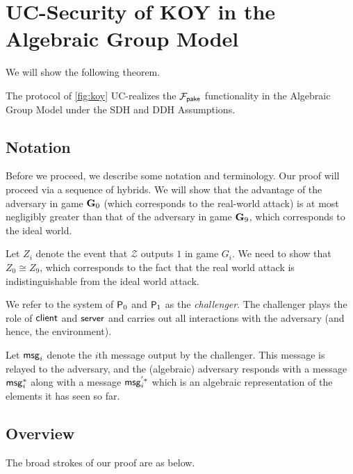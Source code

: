 \section{UC-Security of KOY in the Algebraic Group Model}

We will show the following theorem.

\begin{theorem}
	The protocol of \cref{fig:koy} UC-realizes the $\mathcal{F}_{\mathsf{pake}}$ functionality in the Algebraic Group Model under the SDH and DDH Assumptions.
\end{theorem}

\subsection{Notation}

Before we proceed, we describe some notation and terminology. Our proof will proceed via a sequence of hybrids. We will show that the advantage of the adversary in game $\mathbf{G}_0$ (which corresponds to the real-world attack) is at most negligibly greater than that of the adversary in game $\mathbf{G}_9$, which corresponds to the ideal world.

Let $Z_i$ denote the event that $\mathcal{Z}$ outputs $1$ in game $G_i$. We need to show that $Z_0\cong Z_9$, which corresponds to the fact that the real world attack is indistinguishable from the ideal world attack.

We refer to the system of $\mathsf{P}_0$ and $\mathsf{P}_1$ as the \textit{challenger}. The challenger plays the role of $\mathsf{client}$ and $\mathsf{server}$ and carries out all interactions with the adversary (and hence, the environment).

Let $\mathsf{msg}_{i}$ denote the $i$th message output by the challenger. This message is relayed to the adversary, and the (algebraic) adversary responds with a message $\mathsf{msg}_{i}^{*}$ along with a message $\mathsf{msg}_{i}^{'*}$ which is an algebraic representation of the elements it has seen so far. 


\subsection{Overview}

The broad strokes of our proof are as below.

